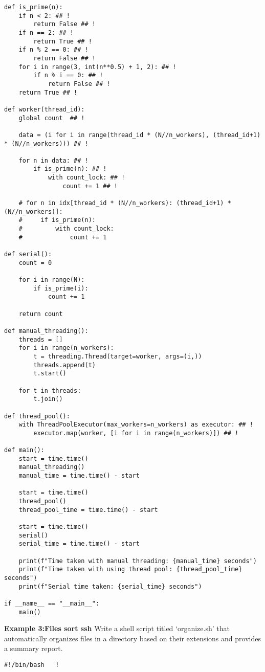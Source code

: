 \documentclass[10pt, a4paper]{article}
\begin{document}
\begin{multicols}{3}
\begin{lstlisting}[style=pythoncompact]
def is_prime(n):
    if n < 2: ## !
        return False ## !
    if n == 2: ## !
        return True ## !
    if n % 2 == 0: ## !
        return False ## !
    for i in range(3, int(n**0.5) + 1, 2): ## !
        if n % i == 0: ## !
            return False ## !
    return True ## !

def worker(thread_id):
    global count  ## !
 
    data = (i for i in range(thread_id * (N//n_workers), (thread_id+1) * (N//n_workers))) ## !

    for n in data: ## !
        if is_prime(n): ## !
            with count_lock: ## !
                count += 1 ## !

    # for n in idx[thread_id * (N//n_workers): (thread_id+1) * (N//n_workers)]:
    #     if is_prime(n):
    #         with count_lock:
    #             count += 1

def serial():
    count = 0

    for i in range(N):
        if is_prime(i):
            count += 1

    return count

def manual_threading():
    threads = []
    for i in range(n_workers):
        t = threading.Thread(target=worker, args=(i,))
        threads.append(t)
        t.start()

    for t in threads:
        t.join()

def thread_pool():
    with ThreadPoolExecutor(max_workers=n_workers) as executor: ## !
        executor.map(worker, [i for i in range(n_workers)]) ## !

def main():
    start = time.time()
    manual_threading()
    manual_time = time.time() - start

    start = time.time()
    thread_pool()
    thread_pool_time = time.time() - start

    start = time.time()
    serial()
    serial_time = time.time() - start

    print(f"Time taken with manual threading: {manual_time} seconds")
    print(f"Time taken with using thread pool: {thread_pool_time} seconds")
    print(f"Serial time taken: {serial_time} seconds")

if __name__ == "__main__":
    main()
\end{lstlisting}

\textbf{Example 3:Files sort ssh}
Write a shell script titled ‘organize.sh’ that automatically organizes files in a directory based on their extensions and provides a summary report.
\begin{lstlisting}[style=pythoncompact]
#!/bin/bash   !


\end{lstlisting}
\end{multicols}
\end{document}
